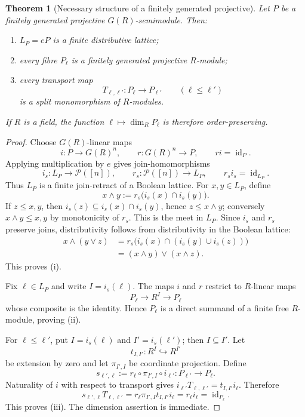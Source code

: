 \documentclass[11pt]{amsart}
\numberwithin{equation}{section}
\newtheorem{theorem}{Theorem}[section]
\theoremstyle{definition}
\newcommand{\id}{\operatorname{id}}
\begin{document}
\begin{theorem}[Necessary structure of a finitely generated projective]
\label{thm:projective-support-structure}
Let $P$ be a finitely generated projective $G(R)$-semimodule.  Then:
\begin{enumerate}[label=\textup{(\roman*)}]
\item $L_P=eP$ is a finite distributive lattice;
\item every fibre $P_\ell$ is a finitely generated projective $R$-module;
\item every transport map
\[
T_{\ell,\ell'}:P_\ell\longrightarrow P_{\ell'}
\qquad(\ell\leq\ell')
\]
is a split monomorphism of $R$-modules.
\end{enumerate}
If $R$ is a field, the function
$\ell\mapsto\dim_R P_\ell$ is therefore order-preserving.
\end{theorem}

\begin{proof}
Choose $G(R)$-linear maps
\[
i:P\longrightarrow G(R)^n,
\qquad
r:G(R)^n\longrightarrow P,
\qquad
r i=\id_P.
\]
Applying multiplication by $e$ gives join-homomorphisms
\[
i_s:L_P\longrightarrow\mathcal P([n]),
\qquad
r_s:\mathcal P([n])\longrightarrow L_P,
\qquad
r_s i_s=\id_{L_P}.
\]
Thus $L_P$ is a finite join-retract of a Boolean lattice.  For
$x,y\in L_P$, define
\[
x\wedge y:=r_s\bigl(i_s(x)\cap i_s(y)\bigr).
\]
If $z\leq x,y$, then $i_s(z)\subseteq i_s(x)\cap i_s(y)$, hence
$z\leq x\wedge y$; conversely $x\wedge y\leq x,y$ by monotonicity of
$r_s$.  This is the meet in $L_P$.  Since $i_s$ and $r_s$ preserve joins,
distributivity follows from distributivity in the Boolean lattice:
\[
\begin{aligned}
x\wedge(y\vee z)
&=r_s\bigl(i_s(x)\cap(i_s(y)\cup i_s(z))\bigr)\\
&=(x\wedge y)\vee(x\wedge z).
\end{aligned}
\]
This proves (i).

Fix $\ell\in L_P$ and write $I=i_s(\ell)$.  The maps $i$ and $r$
restrict to $R$-linear maps
\[
P_\ell\longrightarrow R^I\longrightarrow P_\ell
\]
whose composite is the identity.  Hence $P_\ell$ is a direct summand of a
finite free $R$-module, proving (ii).

For $\ell\leq\ell'$, put $I=i_s(\ell)$ and $I'=i_s(\ell')$; then
$I\subseteq I'$.  Let
\[
t_{I,I'}:R^I\hookrightarrow R^{I'}
\]
be extension by zero and let $\pi_{I',I}$ be coordinate projection.  Define
\[
s_{\ell',\ell}
:=r_\ell\circ\pi_{I',I}\circ i_{\ell'}:P_{\ell'}\to P_\ell.
\]
Naturality of $i$ with respect to transport gives
$i_{\ell'}T_{\ell,\ell'}=t_{I,I'}i_\ell$.  Therefore
\[
s_{\ell',\ell}T_{\ell,\ell'}
=r_\ell\pi_{I',I}t_{I,I'}i_\ell
=r_\ell i_\ell
=\id_{P_\ell}.
\]
This proves (iii).  The dimension assertion is immediate.
\end{proof}
\end{document}
